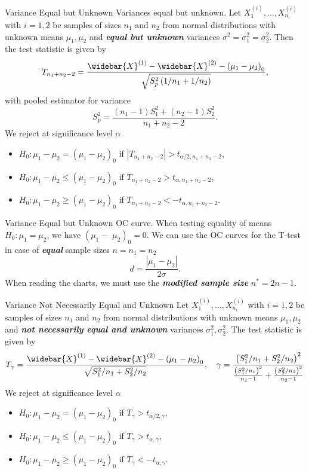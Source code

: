 \documentclass{beamer}
\newcommand{\bb}[1]{\textcolor{antiquefuchsia}{\textbf{\textit{#1}}}}
\begin{document}
\begin{frame}{Variance Equal but Unknown}
Variances equal but unknown. Let $X_{1}^{(i)}, \ldots, X_{n_{i}}^{(i)}$ with $i=1,2$ be samples of sizes $n_{1}$ and $n_{2}$ from normal distributions with unknown means $\mu_{1}, \mu_{2}$ and \bb{equal but unknown} variances $\sigma^{2}=\sigma_{1}^{2}=\sigma_{2}^{2}$. Then the test statistic is given by
$$
T_{n_{1}+n_{2}-2}=\frac{\widebar{X}^{(1)}-\widebar{X}^{(2)}-\left(\mu_{1}-\mu_{2}\right)_{0}}{\sqrt{S_{p}^{2}\left(1 / n_{1}+1 / n_{2}\right)}},
$$
with pooled estimator for variance
$$
S_{p}^{2}=\frac{\left(n_{1}-1\right) S_{1}^{2}+\left(n_{2}-1\right) S_{2}^{2}}{n_{1}+n_{2}-2} .
$$
We reject at significance level $\alpha$
\begin{itemize}
\item $H_{0}: \mu_{1}-\mu_{2}=\left(\mu_{1}-\mu_{2}\right)_{0}$ if $\left|T_{n_{1}+n_{2}-2}\right|>t_{\alpha / 2, n_{1}+n_{2}-2}$,
\item $H_{0}: \mu_{1}-\mu_{2} \leq\left(\mu_{1}-\mu_{2}\right)_{0}$ if $T_{n_{1}+n_{2}-2}>t_{\alpha, n_{1}+n_{2}-2}$,
\item $H_{0}: \mu_{1}-\mu_{2} \geq\left(\mu_{1}-\mu_{2}\right)_{0}$ if $T_{n_{1}+n_{2}-2}<-t_{\alpha, n_{1}+n_{2}-2}$.
\end{itemize}
\end{frame}

\begin{frame}{Variance Equal but Unknown}
OC curve. When testing equality of means $H_{0}: \mu_{1}=\mu_{2}$, we have $\left(\mu_{1}-\right.$ $\left.\mu_{2}\right)_{0}=0$. We can use the OC curves for the T-test in case of \bb{equal} sample sizes $n=n_{1}=n_{2}$
$$
d=\frac{\left|\mu_{1}-\mu_{2}\right|}{2 \sigma} .
$$
When reading the charts, we must use the \bb{modified sample size} $n^{*}=2 n-1$.
\end{frame}

\begin{frame}{Variance Not Necessarily Equal and Unknown}
Let $X_{1}^{(i)}, \ldots, X_{n_{i}}^{(i)}$ with $i=1,2$ be samples of sizes $n_{1}$ and $n_{2}$ from normal distributions with unknown means $\mu_{1}, \mu_{2}$ and \bb{not necessarily equal and unknown} variances $\sigma_{1}^{2}, \sigma_{2}^{2}$. The test statistic is given by
$$
T_{\gamma}=\frac{\widebar{X}^{(1)}-\widebar{X}^{(2)}-\left(\mu_{1}-\mu_{2}\right)_{0}}{\sqrt{S_{1}^{2} / n_{1}+S_{2}^{2} / n_{2}}}, \quad \gamma=\frac{\left(S_{1}^{2} / n_{1}+S_{2}^{2} / n_{2}\right)^{2}}{\frac{\left(S_{1}^{2} / n_{1}\right)^{2}}{n_{1}-1}+\frac{\left(S_{2}^{2} / n_{2}\right)^{2}}{n_{2}-1}}
$$
We reject at significance level $\alpha$
\begin{itemize}
\item $H_{0}: \mu_{1}-\mu_{2}=\left(\mu_{1}-\mu_{2}\right)_{0}$ if $T_{\gamma}>t_{\alpha / 2, \gamma}$,
\item $H_{0}: \mu_{1}-\mu_{2} \leq\left(\mu_{1}-\mu_{2}\right)_{0}$ if $T_{\gamma}>t_{\alpha, \gamma}$,
\item $H_{0}: \mu_{1}-\mu_{2} \geq\left(\mu_{1}-\mu_{2}\right)_{0}$ if $T_{\gamma}<-t_{\alpha, \gamma}$.
\end{itemize}
\end{frame}
\end{document}
